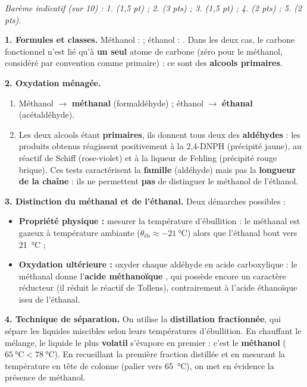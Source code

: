 \documentclass[11pt]{article}
\begin{document}
\begin{corrige}
\emph{Barème indicatif (sur 10) : 1. (1,5 pt) ; 2. (3 pts) ; 3. (1,5 pt) ; 4. (2 pts) ; 5. (2 pts).}

\textbf{1. Formules et classes.} Méthanol :  ; éthanol : . Dans les deux cas, le carbone fonctionnel n'est lié qu'à \textbf{un seul} atome de carbone (zéro pour le méthanol, considéré par convention comme primaire) : ce sont des \textbf{alcools primaires}.

\textbf{2. Oxydation ménagée.}
\begin{enumerate}
\item Méthanol $\rightarrow$ \textbf{méthanal}  (formaldéhyde) ; éthanol $\rightarrow$ \textbf{éthanal}  (acétaldéhyde).
\item Les deux alcools étant \textbf{primaires}, ils donnent tous deux des \textbf{aldéhydes} : les produits obtenus réagissent positivement à la 2,4-DNPH (précipité jaune), au réactif de Schiff (rose-violet) et à la liqueur de Fehling (précipité rouge brique). Ces tests caractérisent la \textbf{famille} (aldéhyde) mais pas la \textbf{longueur de la chaîne} : ils ne permettent \textbf{pas} de distinguer le méthanol de l'éthanol.
\end{enumerate}

\textbf{3. Distinction du méthanal et de l'éthanal.} Deux démarches possibles :
\begin{itemize}
\item \textbf{Propriété physique :} mesurer la température d'ébullition : le méthanal est gazeux à température ambiante ($\theta_{\text{éb}} \approx \SI{-21}{\celsius}$) alors que l'éthanal bout vers \SI{21}{\celsius} ;
\item \textbf{Oxydation ultérieure :} oxyder chaque aldéhyde en acide carboxylique : le méthanal donne l'\textbf{acide méthanoïque} , qui possède encore un caractère réducteur (il réduit le réactif de Tollens), contrairement à l'acide éthanoïque  issu de l'éthanal.
\end{itemize}

\textbf{4. Technique de séparation.} On utilise la \textbf{distillation fractionnée}, qui sépare les liquides miscibles selon leurs températures d'ébullition. En chauffant le mélange, le liquide le plus \textbf{volatil} s'évapore en premier : c'est le \textbf{méthanol} ($\SI{65}{\celsius} < \SI{78}{\celsius}$). En recueillant la première fraction distillée et en mesurant la température en tête de colonne (palier vers \SI{65}{\celsius}), on met en évidence la présence de méthanol.


\end{corrige}
\end{document}
